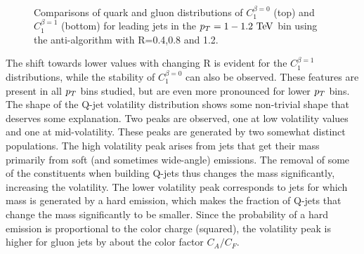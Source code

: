 \begin{figure}
\begin{center}
\\
\caption{Comparisons of quark and gluon distributions of $C_1^{\beta=0}$ (top) and $C_1^{\beta=1}$ (bottom) 
for leading jets in the $\pt=1-1.2 \TeV$ bin using the anti-\kT algorithm with R=0.4,0.8 and 1.2. }
\label{fig:Rdep_qg_C_pt1000}
\end{center}
\end{figure}
The shift towards lower values with changing R is evident for the $C_1^{\beta=1}$ distributions, while the stability
of $C_1^{\beta=0}$ can also be observed. These features are present in all $p_T$ bins studied, but are even more
pronounced for lower $p_T$ bins. The shape of the Q-jet volatility distribution shows some non-trivial shape that
deserves some explanation. Two peaks are observed, one at low volatility values and one at mid-volatility. These
peaks are generated by two somewhat distinct populations. The high volatility peak arises from jets that get their
mass primarily from soft (and sometimes wide-angle) emissions. The removal of some of the constituents when
building Q-jets thus changes the mass significantly, increasing the volatility. The lower volatility peak corresponds
to jets for which mass is generated by a hard emission, which makes the fraction of Q-jets that change 
the mass significantly to be smaller. Since the probability of a hard emission is proportional to the color
charge (squared),  the volatility peak is higher for gluon jets by about the color factor $C_A/C_F$. 

